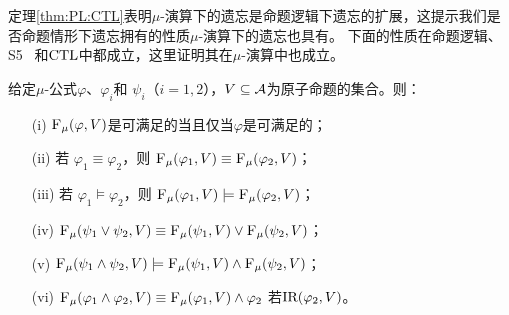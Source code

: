 定理\ref{thm:PL:CTL}表明$\mu$-演算下的遗忘是命题逻辑下遗忘的扩展，这提示我们是否命题情形下遗忘拥有的性质$\mu$-演算下的遗忘也具有。
下面的性质在命题逻辑、S5~\cite{Yan:AIJ:2009} 和$\textrm{CTL}$中都成立，这里证明其在$\mu$-演算中也成立。
\begin{proposition}
	\label{chapter06:pro:ctl:forget:1}
	给定$\mu$-公式$\varphi$、$\varphi_i$和 $\psi_i$（$i=1,2$），$V\subseteq {\cal A}$为原子命题的集合。则：
	\begin{itemize}
		\item[(i)] ${\textsc{F}_{\textsc{$\mu$}}}(\varphi, V)$是可满足的当且仅当$\varphi$是可满足的；
		\item[(ii)] 若 $\varphi_1 \equiv \varphi_2$，则 ${\textsc{F}_{\textsc{$\mu$}}}(\varphi_1, V) \equiv {\textsc{F}_{\textsc{$\mu$}}}(\varphi_2, V)$；
		\item[(iii)] 若 $\varphi_1 \models \varphi_2$，则 ${\textsc{F}_{\textsc{$\mu$}}}(\varphi_1, V) \models {\textsc{F}_{\textsc{$\mu$}}}(\varphi_2, V)$；
		\item[(iv)] ${\textsc{F}_{\textsc{$\mu$}}}(\psi_1 \vee \psi_2, V) \equiv {\textsc{F}_{\textsc{$\mu$}}}(\psi_1, V) \vee {\textsc{F}_{\textsc{$\mu$}}}(\psi_2, V)$；
		\item[(v)] ${\textsc{F}_{\textsc{$\mu$}}}(\psi_1 \wedge \psi_2, V) \models {\textsc{F}_{\textsc{$\mu$}}}(\psi_1, V) \wedge {\textsc{F}_{\textsc{$\mu$}}}(\psi_2, V)$；
		\item[(vi)] ${\textsc{F}_{\textsc{$\mu$}}}(\varphi_1 \wedge \varphi_2, V) \equiv {\textsc{F}_{\textsc{$\mu$}}}(\varphi_1, V) \wedge \varphi_2$ 若$\textrm{IR}(\varphi_2, V)$。
	\end{itemize}
\end{proposition}
